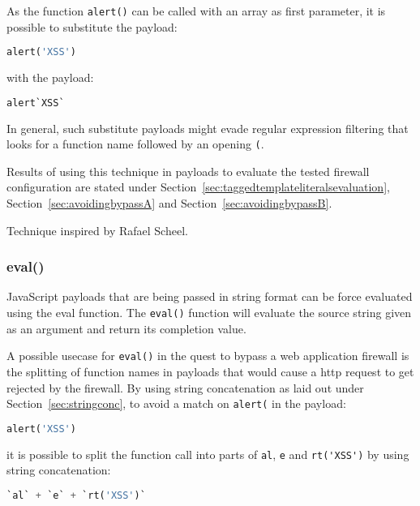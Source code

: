 As the function \verb|alert()| can be called with an array as first parameter, it is possible to substitute the payload:
\begin{lstlisting}[style=basicStyle,language=Python]
alert('XSS')
\end{lstlisting}

with the payload:

\begin{lstlisting}[style=basicStyle,language=Python]
alert`XSS`
\end{lstlisting}

In general, such substitute payloads might evade regular expression filtering that looks for a function name followed by an opening \verb|(|.

Results of using this technique in payloads to evaluate the tested firewall configuration are stated under Section~\ref{sec:taggedtemplateliteralsevaluation}, Section~\ref{sec:avoidingbypassA} and Section~\ref{sec:avoidingbypassB}.

Technique inspired by Rafael Scheel. \cite{onecons/wafbypass}

\subsubsection{eval()}
\label{sec:eval}

JavaScript payloads that are being passed in string format can be force evaluated using the eval function. The \verb|eval()| function will evaluate the source string given as an argument and return its completion value. \cite{js/eval}

A possible usecase for \verb|eval()| in the quest to bypass a web application firewall is the splitting of function names in payloads that would cause a \acrshort{http} request to get rejected by the firewall. By using string concatenation as laid out under Section~\ref{sec:stringconc}, to avoid a match on \verb|alert(| in the payload:

\begin{lstlisting}[style=basicStyle,language=Python]
alert('XSS')
\end{lstlisting}

it is possible to split the function call into parts of \verb|al|, \verb|e| and \verb|rt('XSS')| by using string concatenation:

\begin{lstlisting}[style=basicStyle,language=Python]
`al` + `e` + `rt('XSS')`
\end{lstlisting}

